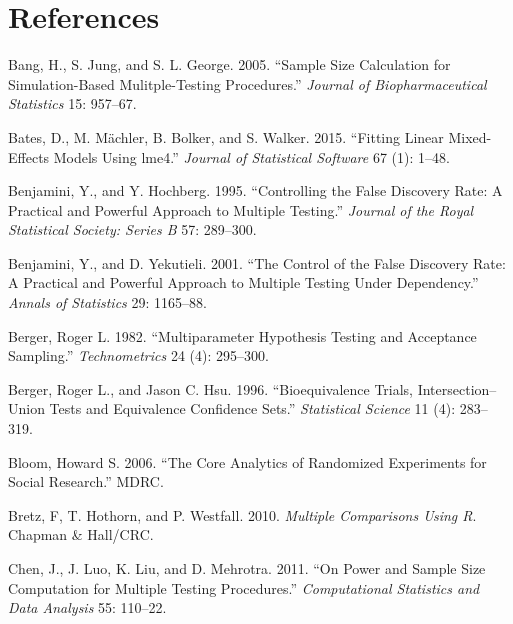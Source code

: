 \documentclass{article}
\newlength{\cslhangindent}
\newlength{\cslentryspacingunit} %
\newenvironment{CSLReferences}[2] %
 {%
  \setlength{\parindent}{0pt}
  \ifodd #1
  \let\oldpar\par
  \def\par{\hangindent=\cslhangindent\oldpar}
  \fi
  \setlength{\parskip}{#2\cslentryspacingunit}
 }%
 {}
\begin{document}
\section*{References}

\hypertarget{refs}{}
\begin{CSLReferences}{1}{0}
\leavevmode{}%
Bang, H., S. Jung, and S. L. George. 2005. {``Sample Size Calculation
for Simulation-Based Mulitple-Testing Procedures.''} \emph{Journal of
Biopharmaceutical Statistics} 15: 957--67.

\leavevmode{}%
Bates, D., M. Mächler, B. Bolker, and S. Walker. 2015. {``Fitting Linear
Mixed-Effects Models Using {lme4}.''} \emph{Journal of Statistical
Software} 67 (1): 1--48.

\leavevmode{}%
Benjamini, Y., and Y. Hochberg. 1995. {``Controlling the False Discovery
Rate: A Practical and Powerful Approach to Multiple Testing.''}
\emph{Journal of the Royal Statistical Society: Series B} 57: 289--300.

\leavevmode{}%
Benjamini, Y., and D. Yekutieli. 2001. {``The Control of the False
Discovery Rate: A Practical and Powerful Approach to Multiple Testing
Under Dependency.''} \emph{Annals of Statistics} 29: 1165--88.

\leavevmode{}%
Berger, Roger L. 1982. {``Multiparameter Hypothesis Testing and
Acceptance Sampling.''} \emph{Technometrics} 24 (4): 295--300.

\leavevmode{}%
Berger, Roger L., and Jason C. Hsu. 1996. {``Bioequivalence Trials,
Intersection--Union Tests and Equivalence Confidence Sets.''}
\emph{Statistical Science} 11 (4): 283--319.

\leavevmode{}%
Bloom, Howard S. 2006. {``The Core Analytics of Randomized Experiments
for Social Research.''} MDRC.

\leavevmode{}%
Bretz, F, T. Hothorn, and P. Westfall. 2010. \emph{Multiple Comparisons
Using {R}}. Chapman \& Hall/CRC.

\leavevmode{}%
Chen, J., J. Luo, K. Liu, and D. Mehrotra. 2011. {``On Power and Sample
Size Computation for Multiple Testing Procedures.''} \emph{Computational
Statistics and Data Analysis} 55: 110--22.


\end{CSLReferences}
\end{document}
